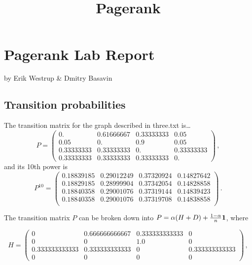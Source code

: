 \documentclass{tufte-handout}
\title{\sf Pagerank}
\begin{document}
\maketitle

\section{Pagerank Lab Report}

by Erik Westrup \& Dmitry Basavin

\subsection{Transition probabilities}

The transition matrix for the graph described in three.txt
is\ldots
\begin{equation*}
P = 
\left(
\begin{array}{cccc}
0.          & 0.61666667  & 0.33333333  & 0.05\\
0.05        & 0.          & 0.9         & 0.05\\
0.33333333  & 0.33333333  & 0.          & 0.33333333\\
0.33333333  & 0.33333333  & 0.33333333  & 0.
\end{array}
\right)\,,
\end{equation*}
and its 10th power is
\begin{equation*}
P^{10} = 
\left(
\begin{array}{cccc}
0.18839185  & 0.29012249  & 0.37320924  & 0.14827642\\
0.18829185  & 0.28999904  & 0.37342054  & 0.14828858\\
0.18840358  & 0.29001076  & 0.37319144  & 0.14839423\\
0.18840358  & 0.29001076  & 0.37319708  & 0.14838858\\
\end{array}
\right)\,.
\end{equation*}

The transition matrix $P$ can be broken down into  $P = \alpha(H + D)
+ \frac{1-\alpha}{n} \bf 1$, where 

\begin{equation*}
H =
\left(
\begin{array}{cccc}
0 & 0.666666666667 & 0.333333333333 & 0 \\
0 & 0 & 1.0 & 0 \\
0.333333333333 & 0.333333333333 & 0 & 0.333333333333 \\
0 & 0 & 0 & 0
\end{array}
\right)\,,
\end{equation*}
\end{document}

